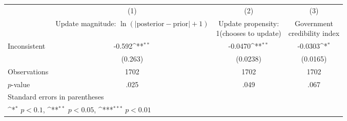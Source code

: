 {
\def\sym#1{\ifmmode^{#1}\else\(^{#1}\)\fi}
\begin{tabular}{l*{3}{c}}
\hline\hline
                    &\multicolumn{1}{c}{(1)}         &\multicolumn{1}{c}{(2)}         &\multicolumn{1}{c}{(3)}         \\
                    &\shortstack{Update magnitude: \\ $ \ln(|\text{posterior}-\text{prior} | + 1) $}         &\shortstack{Update propensity: \\ 1(chooses to update)}         &\shortstack{Government \\ credibility index}         \\
\hline
Inconsistent        &      -0.592\sym{**} &     -0.0470\sym{**} &     -0.0303\sym{*}  \\
                    &     (0.263)         &    (0.0238)         &    (0.0165)         \\
\hline
Observations        &        1702         &        1702         &        1702         \\
$p$-value           &        .025         &        .049         &        .067         \\
\hline\hline
\multicolumn{4}{l}{\footnotesize Standard errors in parentheses}\\
\multicolumn{4}{l}{\footnotesize \sym{*} \(p<0.1\), \sym{**} \(p<0.05\), \sym{***} \(p<0.01\)}\\
\end{tabular}
}
